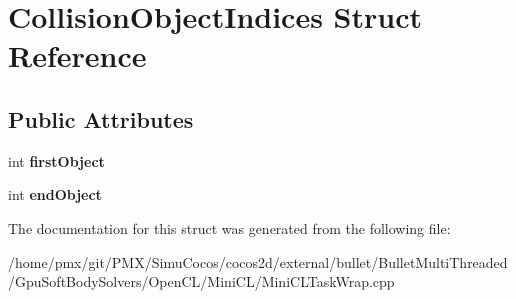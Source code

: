 \hypertarget{structCollisionObjectIndices}{}\section{Collision\+Object\+Indices Struct Reference}
\label{structCollisionObjectIndices}
\subsection*{Public Attributes}
\begin{DoxyCompactItemize}
\item 
\mbox{\label{structCollisionObjectIndices_a2e413dc0e33607ad6c582d5e9ec54e95}} 
int {\bfseries first\+Object}
\item 
\mbox{\label{structCollisionObjectIndices_aa08eec8cd3f72e7013bad29c75b6cc28}} 
int {\bfseries end\+Object}
\end{DoxyCompactItemize}


The documentation for this struct was generated from the following file\+:\begin{DoxyCompactItemize}
\item 
/home/pmx/git/\+P\+M\+X/\+Simu\+Cocos/cocos2d/external/bullet/\+Bullet\+Multi\+Threaded/\+Gpu\+Soft\+Body\+Solvers/\+Open\+C\+L/\+Mini\+C\+L/Mini\+C\+L\+Task\+Wrap.\+cpp\end{DoxyCompactItemize}
